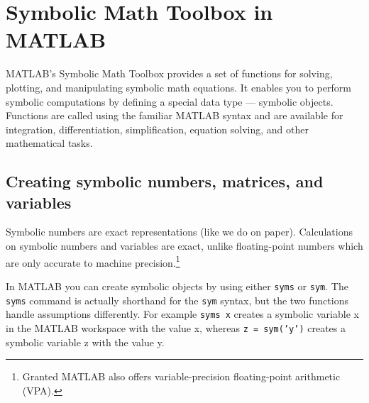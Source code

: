 \section[Symbolic Math Toolbox in MATLAB]{Symbolic Math Toolbox in MATLAB\label{ex:MatlabSymbolicToolbox}}
MATLAB's Symbolic Math Toolbox provides a set of functions for solving, plotting, and manipulating symbolic math equations.
It enables you to perform symbolic computations by defining a special data type — symbolic objects.
Functions are called using the familiar MATLAB syntax
  and are available for integration, differentiation, simplification, equation solving, and other mathematical tasks.

\subsection*{Creating symbolic numbers, matrices, and variables}
Symbolic numbers are exact representations (like we do on paper).
Calculations on symbolic numbers and variables are exact,
  unlike floating-point numbers which are only accurate to machine precision.\footnote{%
  Granted MATLAB also offers variable-precision floating-point arithmetic (VPA).
}

In MATLAB you can create symbolic objects by using either \texttt{syms} or \texttt{sym}.
The \texttt{syms} command is actually shorthand for the \texttt{sym} syntax,
  but the two functions handle assumptions differently.
For example \texttt{syms x} creates a symbolic variable x in the MATLAB workspace with the value x,
  whereas \texttt{z = sym{('y')}} creates a symbolic variable z with the value y.

